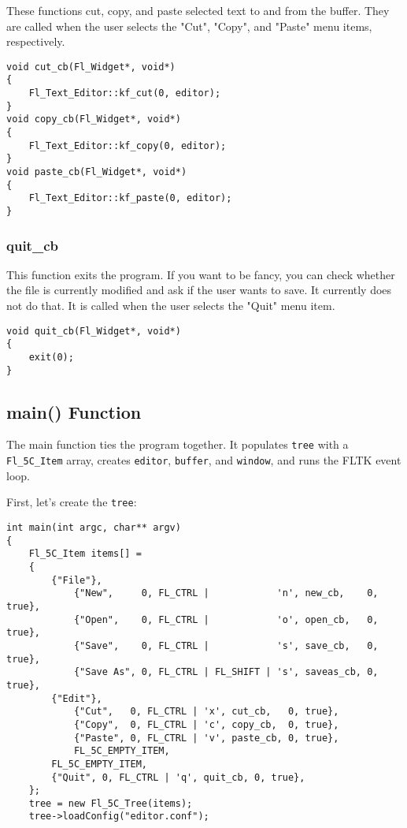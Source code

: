 These functions cut, copy, and paste selected text to and from the buffer.
They are called when the user selects the "Cut", "Copy", and "Paste" menu
items, respectively.

\begin{samepage}
\begin{verbatim}
void cut_cb(Fl_Widget*, void*)
{
    Fl_Text_Editor::kf_cut(0, editor);
}
void copy_cb(Fl_Widget*, void*)
{
    Fl_Text_Editor::kf_copy(0, editor);
}
void paste_cb(Fl_Widget*, void*)
{
    Fl_Text_Editor::kf_paste(0, editor);
}
\end{verbatim}
\end{samepage}

\subsubsection{quit\_cb}

This function exits the program.  If you want to be fancy, you can check
whether the file is currently modified and ask if the user wants to save.  It
currently does not do that.  It is called when the user selects the "Quit"
menu item.

\begin{samepage}
\begin{verbatim}
void quit_cb(Fl_Widget*, void*)
{
    exit(0);
}
\end{verbatim}
\end{samepage}

\subsection{main() Function}

The main function ties the program together.  It populates \texttt{tree} with
a \texttt{Fl\_5C\_Item} array, creates \texttt{editor}, \texttt{buffer}, and
\texttt{window}, and runs the FLTK event loop.

First, let's create the \texttt{tree}:

\begin{samepage}
\begin{verbatim}
int main(int argc, char** argv)
{
    Fl_5C_Item items[] =
    {
        {"File"},
            {"New",     0, FL_CTRL |            'n', new_cb,    0, true},
            {"Open",    0, FL_CTRL |            'o', open_cb,   0, true},
            {"Save",    0, FL_CTRL |            's', save_cb,   0, true},
            {"Save As", 0, FL_CTRL | FL_SHIFT | 's', saveas_cb, 0, true},
        {"Edit"},
            {"Cut",   0, FL_CTRL | 'x', cut_cb,   0, true},
            {"Copy",  0, FL_CTRL | 'c', copy_cb,  0, true},
            {"Paste", 0, FL_CTRL | 'v', paste_cb, 0, true},
            FL_5C_EMPTY_ITEM,
        FL_5C_EMPTY_ITEM,
        {"Quit", 0, FL_CTRL | 'q', quit_cb, 0, true},
    };
    tree = new Fl_5C_Tree(items);
    tree->loadConfig("editor.conf");
\end{verbatim}
\end{samepage}

